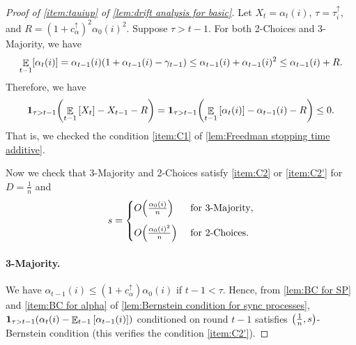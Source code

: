 \documentclass[letterpaper,11pt]{article}
\DeclarePairedDelimiter{\sbra}{\lbrack}{\rbrack} %
\newcommand{\indicator}{\mathbf{1}}
\DeclareMathOperator*{\E}{\mathbb{E}}
\newcommand{\alphanorm}{\gamma}
\newcommand{\bounded}{D}
\newcommand{\variance}{s}
\newcommand{\tauiup}{\tau^{\uparrow}_i}
\newcommand{\ciup}{c_\alpha^{\uparrow}}
\newcommand{\drift}{R}
\begin{document}
\begin{proof}[Proof of \cref{item:tauiup} of \cref{lem:drift analysis for basic}]
    Let $X_t=\alpha_t(i)$, $\tau=\tauiup$, and $\drift = 
        (1+\ciup)^2\alpha_0(i)^2$.
    Suppose $\tau>t-1$.
    For both 2-Choices and 3-Majority, we have
    \begin{align*}
    \E_{t-1}\sbra{\alpha_t(i)}
    =\alpha_{t-1}(i)\qty(1+\alpha_{t-1}(i)-\alphanorm_{t-1})
    \leq \alpha_{t-1}(i)+\alpha_{t-1}(i)^2
    \leq \alpha_{t-1}(i)+R.
    \end{align*}
    Therefore, we have
    \begin{align*}
    \indicator_{\tau>t-1}\qty(\E_{t-1}\qty[X_t]-X_{t-1}-R)
    =\indicator_{\tau>t-1}\qty(\E_{t-1}\qty[\alpha_t(i)]-\alpha_{t-1}(i)-R)
    \leq 0.
    \end{align*}
    That is, we checked the condition \ref{item:C1} of \cref{lem:Freedman stopping time additive}.

    Now we check that 3-Majority and 2-Choices satisfy \ref{item:C2} or \ref{item:C2'} for $\bounded = \frac{1}{n}$ and
        \begin{align} 
       s = \begin{cases}
        O\qty( \frac{\alpha_0(i)}{n} )	& \text{ for 3-Majority},\\[10pt]
        O\qty( \frac{\alpha_0(i)^2}{n} ) & \text{ for 2-Choices}.
       \end{cases} \label{eq:variance tauiup}
    \end{align}

    \paragraph*{3-Majority.}
    We have $\alpha_{t-1}(i) \le (1+\ciup)\alpha_0(i)$ if $ t-1 < \tau $.
    Hence, from \cref{lem:BC for SP} and \cref{item:BC for alpha} of \cref{lem:Bernstein condition for sync processes}, 
    $\indicator_{\tau>t-1}\qty(\alpha_t(i)-\E_{t-1}\qty[ \alpha_{t-1}(i)])$ conditioned on round $t-1$ satisfies $\qty(\frac{1}{n},\variance)$-Bernstein condition (this verifies the condition \ref{item:C2'}).


\end{proof}
\end{document}
